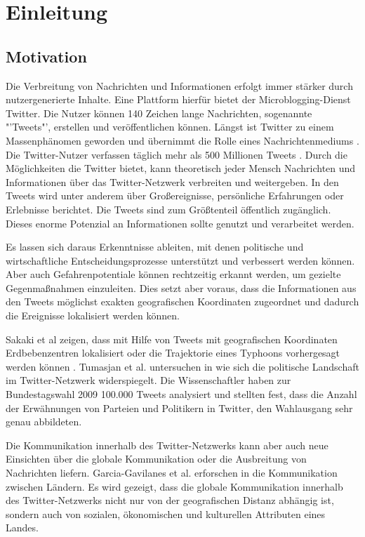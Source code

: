 \chapter{Einleitung}\label{chp:Einleitung}

	\section{Motivation}

		Die Verbreitung von Nachrichten und Informationen erfolgt immer stärker durch nutzergenerierte Inhalte.
		Eine Plattform hierfür bietet der Microblogging-Dienst Twitter. 
		Die Nutzer können 140 Zeichen lange Nachrichten, sogenannte "'Tweets"', erstellen und veröffentlichen können.
		Längst ist Twitter zu einem Massenphänomen geworden und übernimmt die Rolle eines Nachrichtenmediums \cite{Petrovic2013}.
		Die Twitter-Nutzer verfassen täglich mehr als 500 Millionen Tweets \cite{twitterinc2013}. 
		Durch die Möglichkeiten die Twitter bietet, kann theoretisch jeder Mensch Nachrichten und Informationen über das Twitter-Netzwerk verbreiten und weitergeben. 
		In den Tweets wird unter anderem über Großereignisse, persönliche Erfahrungen oder Erlebnisse berichtet. 
		Die Tweets sind zum Größtenteil öffentlich zugänglich.
		Dieses enorme Potenzial an Informationen sollte genutzt und verarbeitet werden.
		
		Es lassen sich daraus Erkenntnisse ableiten, mit denen politische und wirtschaftliche Entscheidungsprozesse unterstützt und verbessert werden können. 
		Aber auch Gefahrenpotentiale können rechtzeitig erkannt werden, um gezielte Gegenmaßnahmen einzuleiten.
		Dies setzt aber voraus, dass die Informationen aus den Tweets möglichst exakten geografischen Koordinaten zugeordnet und dadurch die Ereignisse lokalisiert werden können.

		Sakaki et al zeigen, dass mit Hilfe von Tweets mit geografischen Koordinaten Erdbebenzentren lokalisiert oder die Trajektorie eines Typhoons vorhergesagt werden können \cite{Sakaki2010}.  
		Tumasjan et al. untersuchen in \cite{Tumasjan2011} wie sich die politische Landschaft im Twitter-Netzwerk widerspiegelt. 
		Die Wissenschaftler haben zur Bundestagswahl 2009 100.000 Tweets analysiert und stellten fest, dass die Anzahl der Erwähnungen von Parteien und Politikern in Twitter, den Wahlausgang sehr genau abbildeten.  
		
		Die Kommunikation innerhalb des Twitter-Netzwerks kann aber auch neue Einsichten über die globale Kommunikation oder die Ausbreitung von Nachrichten liefern.
		Garcia-Gavilanes et al. erforschen in \cite{Garcia-Gavilanes2014} die Kommunikation zwischen Ländern. 
		Es wird gezeigt, dass die globale Kommunikation innerhalb des Twitter-Netzwerks nicht nur von der geografischen Distanz abhängig ist, sondern auch von sozialen, ökonomischen und kulturellen Attributen eines Landes.   

